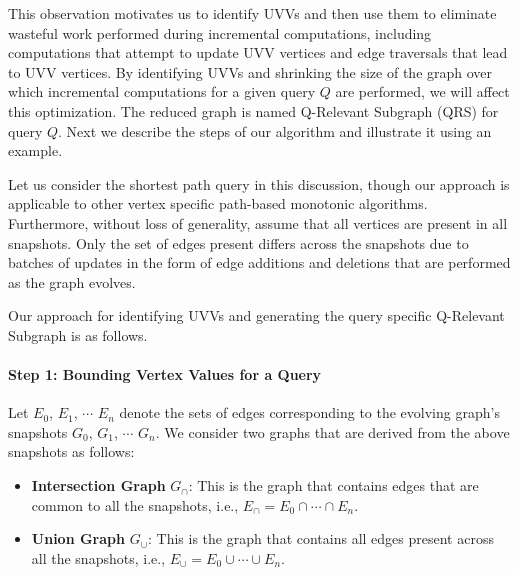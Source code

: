 This observation motivates us to identify UVVs and then use them to eliminate wasteful work performed during incremental computations, including computations that attempt to update UVV vertices and edge traversals that lead to UVV vertices. By identifying UVVs and shrinking the size of the graph over which incremental computations for a given query $Q$ are performed, we will affect this optimization. The reduced graph is named Q-Relevant Subgraph (QRS) for query $Q$. Next we describe the steps of our algorithm and illustrate it using an example.

Let us consider the shortest path query in this discussion, though our approach is applicable to other vertex specific path-based monotonic algorithms. Furthermore, without loss of generality, assume that all vertices are present in all snapshots. Only the set of edges present differs across the snapshots due to batches of updates in the form of edge additions and deletions that are performed as the graph evolves.

\vspace{0.1in}
Our approach for identifying UVVs and generating the query specific Q-Relevant Subgraph is as follows.

\paragraph{Step 1: Bounding Vertex Values for a Query} 
Let $E_0$, $E_1$, $\cdots$ $E_n$ denote the sets of edges corresponding to the evolving graph's snapshots $G_0$, $G_1$, $\cdots$ $G_n$. We consider two graphs that are derived from the above snapshots as follows:

\begin{itemize}\itemsep2pt
    \item \textbf{Intersection Graph} $G_\cap$: This is the graph that contains edges that are common to all the snapshots, i.e., $E_\cap = E_0 \cap \cdots \cap E_n$.
    \item \textbf{Union Graph} $G_\cup$: This is the graph that contains all edges present across all the snapshots, i.e., $E_\cup = E_0 \cup \cdots \cup E_n$.
\end{itemize}


